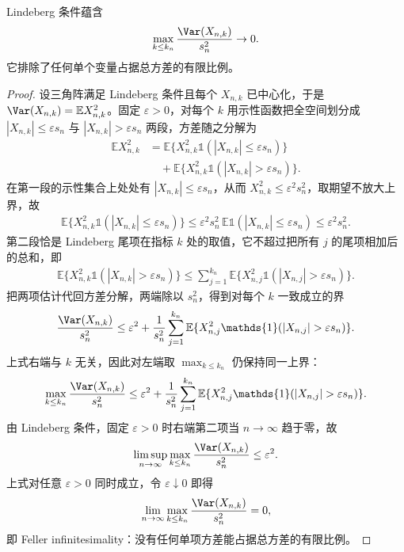\begin{proposition}[单项方差的无穷小性]
Lindeberg 条件蕴含
\[
\max_{k\le k_n}\frac{\Var(X_{n,k})}{s_n^2}\to0.
\]
它排除了任何单个变量占据总方差的有限比例。\end{proposition}
\begin{proof}

设三角阵满足 Lindeberg 条件且每个 $X_{n,k}$ 已中心化，于是 $\Var(X_{n,k})=\mathbb E X_{n,k}^2$。固定 $\varepsilon>0$，对每个 $k$ 用示性函数把全空间划分成 $|X_{n,k}|\le\varepsilon s_n$ 与 $|X_{n,k}|>\varepsilon s_n$ 两段，方差随之分解为
\begin{align*}
\mathbb E X_{n,k}^2
&=\mathbb E\{X_{n,k}^2\mathds{1}(|X_{n,k}|\le\varepsilon s_n)\}\\
&\quad+\mathbb E\{X_{n,k}^2\mathds{1}(|X_{n,k}|>\varepsilon s_n)\}.
\end{align*}
在第一段的示性集合上处处有 $|X_{n,k}|\le\varepsilon s_n$，从而 $X_{n,k}^2\le\varepsilon^2s_n^2$，取期望不放大上界，故
\begin{align*}
\mathbb E\{X_{n,k}^2\mathds{1}(|X_{n,k}|\le\varepsilon s_n)\}
\le\varepsilon^2s_n^2\,\mathbb E\mathds{1}(|X_{n,k}|\le\varepsilon s_n)
\le\varepsilon^2s_n^2.
\end{align*}
第二段恰是 Lindeberg 尾项在指标 $k$ 处的取值，它不超过把所有 $j$ 的尾项相加后的总和，即
\begin{align*}
\mathbb E\{X_{n,k}^2\mathds{1}(|X_{n,k}|>\varepsilon s_n)\}
\le\sum_{j=1}^{k_n}
\mathbb E\{X_{n,j}^2\mathds{1}(|X_{n,j}|>\varepsilon s_n)\}.
\end{align*}
把两项估计代回方差分解，两端除以 $s_n^2$，得到对每个 $k$ 一致成立的界
\begin{align*}
\frac{\Var(X_{n,k})}{s_n^2}
\le\varepsilon^2
+\frac1{s_n^2}\sum_{j=1}^{k_n}
\mathbb E\{X_{n,j}^2\mathds{1}(|X_{n,j}|>\varepsilon s_n)\}.
\end{align*}
上式右端与 $k$ 无关，因此对左端取 $\max_{k\le k_n}$ 仍保持同一上界：
\begin{align*}
\max_{k\le k_n}\frac{\Var(X_{n,k})}{s_n^2}
\le\varepsilon^2
+\frac1{s_n^2}\sum_{j=1}^{k_n}
\mathbb E\{X_{n,j}^2\mathds{1}(|X_{n,j}|>\varepsilon s_n)\}.
\end{align*}
由 Lindeberg 条件，固定 $\varepsilon>0$ 时右端第二项当 $n\to\infty$ 趋于零，故
\begin{align*}
\limsup_{n\to\infty}\max_{k\le k_n}\frac{\Var(X_{n,k})}{s_n^2}
\le\varepsilon^2.
\end{align*}
上式对任意 $\varepsilon>0$ 同时成立，令 $\varepsilon\downarrow0$ 即得
\begin{align*}
\lim_{n\to\infty}\max_{k\le k_n}\frac{\Var(X_{n,k})}{s_n^2}=0,
\end{align*}
即 Feller infinitesimality：没有任何单项方差能占据总方差的有限比例。

\end{proof}

